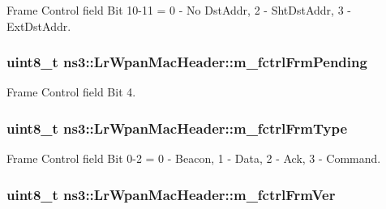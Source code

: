 Frame Control field Bit 10-\/11 = 0 -\/ No Dst\+Addr, 2 -\/ Sht\+Dst\+Addr, 3 -\/ Ext\+Dst\+Addr. 

\subsubsection[{\texorpdfstring{m\+\_\+fctrl\+Frm\+Pending}{m_fctrlFrmPending}}]{\setlength{\rightskip}{0pt plus 5cm}uint8\+\_\+t ns3\+::\+Lr\+Wpan\+Mac\+Header\+::m\+\_\+fctrl\+Frm\+Pending\hspace{0.3cm}{\ttfamily [private]}}\hypertarget{classns3_1_1LrWpanMacHeader_aa31069c87cc52e0d80e5c3c03c46a75b}{}\label{classns3_1_1LrWpanMacHeader_aa31069c87cc52e0d80e5c3c03c46a75b}


Frame Control field Bit 4. 

\subsubsection[{\texorpdfstring{m\+\_\+fctrl\+Frm\+Type}{m_fctrlFrmType}}]{\setlength{\rightskip}{0pt plus 5cm}uint8\+\_\+t ns3\+::\+Lr\+Wpan\+Mac\+Header\+::m\+\_\+fctrl\+Frm\+Type\hspace{0.3cm}{\ttfamily [private]}}\hypertarget{classns3_1_1LrWpanMacHeader_a75256896400cd8198381a083837a47c8}{}\label{classns3_1_1LrWpanMacHeader_a75256896400cd8198381a083837a47c8}


Frame Control field Bit 0-\/2 = 0 -\/ Beacon, 1 -\/ Data, 2 -\/ Ack, 3 -\/ Command. 

\subsubsection[{\texorpdfstring{m\+\_\+fctrl\+Frm\+Ver}{m_fctrlFrmVer}}]{\setlength{\rightskip}{0pt plus 5cm}uint8\+\_\+t ns3\+::\+Lr\+Wpan\+Mac\+Header\+::m\+\_\+fctrl\+Frm\+Ver\hspace{0.3cm}{\ttfamily [private]}}\hypertarget{classns3_1_1LrWpanMacHeader_adfc97a10475b2a94f035bceac0f54170}{}\label{classns3_1_1LrWpanMacHeader_adfc97a10475b2a94f035bceac0f54170}


